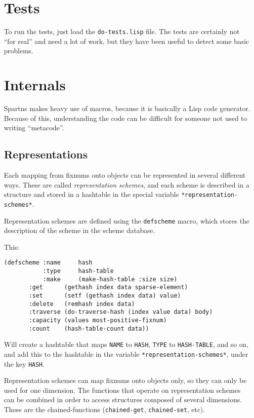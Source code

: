 \documentclass{article}
\begin{document}
\section{Tests}

To run the tests, just load the \verb+do-tests.lisp+ file. The tests are certainly not
``for real'' and need a lot of work, but they have been useful to detect some basic problems.

\section{Internals}

Spartns makes heavy use of macros, because it is basically a Lisp code generator. Because of
this, understanding the code can be difficult for someone not used to writing ``metacode''.

\subsection{Representations}

Each mapping from fixnums onto objects can be represented in several different ways.
These are called {\em representation schemes}, and each scheme is described in a
structure and stored in a hashtable in the special variable \verb+*representation-schemes*+.

Representation schemes are defined using the \verb+defscheme+ macro, which stores
the description of the scheme in the scheme database.

This:

\begin{lstlisting}
(defscheme :name     hash
           :type     hash-table
           :make     (make-hash-table :size size)
	   :get      (gethash index data sparse-element)
	   :set      (setf (gethash index data) value)
	   :delete   (remhash index data)
	   :traverse (do-traverse-hash (index value data) body)
	   :capacity (values most-positive-fixnum)
	   :count    (hash-table-count data))
\end{lstlisting}

Will create a hashtable that maps \verb+NAME+ to \verb+HASH+, \verb+TYPE+ to \verb+HASH-TABLE+, and so on,
and add this to the hashtable in the variable \verb+*representation-schemes*+, under
the key \verb+HASH+.

Representation schemes can map fixnums onto objects only, so they can only be used
for one dimension. The functions that operate on representation schemes can be
combined in order to access structures composed of several dimensions. These are
the chained-functions (\verb+chained-get+, \verb+chained-set+, etc).
\end{document}
